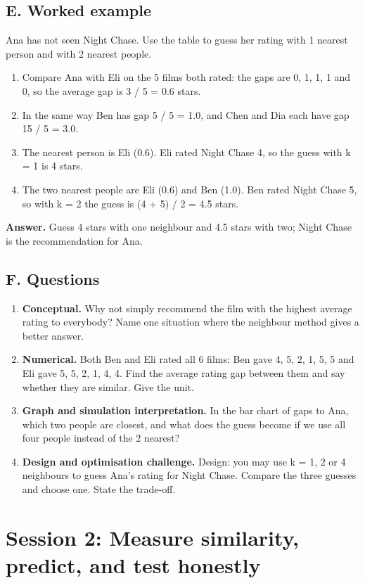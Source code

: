 \documentclass[11pt,a4paper]{article}
\begin{document}
\subsection*{E. Worked example}
Ana has not seen Night Chase. Use the table to guess her rating with 1 nearest person and with 2 nearest people.
\begin{enumerate}[nosep]
\item Compare Ana with Eli on the 5 films both rated: the gaps are 0, 1, 1, 1 and 0, so the average gap is 3 / 5 = 0.6 stars.
\item In the same way Ben has gap 5 / 5 = 1.0, and Chen and Dia each have gap 15 / 5 = 3.0.
\item The nearest person is Eli (0.6). Eli rated Night Chase 4, so the guess with k = 1 is 4 stars.
\item The two nearest people are Eli (0.6) and Ben (1.0). Ben rated Night Chase 5, so with k = 2 the guess is (4 + 5) / 2 = 4.5 stars.
\end{enumerate}
\textbf{Answer.} Guess 4 stars with one neighbour and 4.5 stars with two; Night Chase is the recommendation for Ana.

\subsection*{F. Questions}
\begin{enumerate}[nosep]
\item \textbf{Conceptual.} Why not simply recommend the film with the highest average rating to everybody? Name one situation where the neighbour method gives a better answer.
\item \textbf{Numerical.} Both Ben and Eli rated all 6 films: Ben gave 4, 5, 2, 1, 5, 5 and Eli gave 5, 5, 2, 1, 4, 4. Find the average rating gap between them and say whether they are similar. Give the unit.
\item \textbf{Graph and simulation interpretation.} In the bar chart of gaps to Ana, which two people are closest, and what does the guess become if we use all four people instead of the 2 nearest?
\item \textbf{Design and optimisation challenge.} Design: you may use k = 1, 2 or 4 neighbours to guess Ana's rating for Night Chase. Compare the three guesses and choose one. State the trade-off.
\end{enumerate}

\section{Session 2: Measure similarity, predict, and test honestly}
\end{document}
